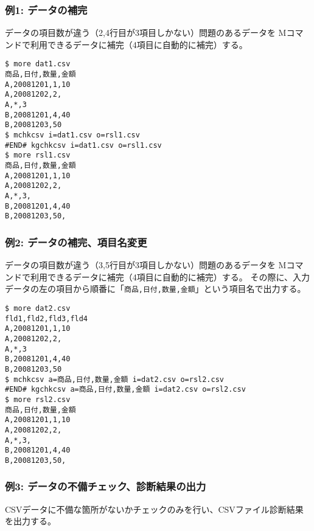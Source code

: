 \subsubsection*{例1: データの補完}

データの項目数が違う（2,4行目が3項目しかない）問題のあるデータを
Mコマンドで利用できるデータに補完（4項目に自動的に補完）する。


\begin{Verbatim}[baselinestretch=0.7,frame=single]
$ more dat1.csv
商品,日付,数量,金額
A,20081201,1,10
A,20081202,2,
A,*,3
B,20081201,4,40
B,20081203,50
$ mchkcsv i=dat1.csv o=rsl1.csv
#END# kgchkcsv i=dat1.csv o=rsl1.csv
$ more rsl1.csv
商品,日付,数量,金額
A,20081201,1,10
A,20081202,2,
A,*,3,
B,20081201,4,40
B,20081203,50,
\end{Verbatim}
\subsubsection*{例2: データの補完、項目名変更}

データの項目数が違う（3,5行目が3項目しかない）問題のあるデータを
Mコマンドで利用できるデータに補完（4項目に自動的に補完）する。
その際に、入力データの左の項目から順番に「\verb|商品,日付,数量,金額|」という項目名で出力する。


\begin{Verbatim}[baselinestretch=0.7,frame=single]
$ more dat2.csv
fld1,fld2,fld3,fld4
A,20081201,1,10
A,20081202,2,
A,*,3
B,20081201,4,40
B,20081203,50
$ mchkcsv a=商品,日付,数量,金額 i=dat2.csv o=rsl2.csv
#END# kgchkcsv a=商品,日付,数量,金額 i=dat2.csv o=rsl2.csv
$ more rsl2.csv
商品,日付,数量,金額
A,20081201,1,10
A,20081202,2,
A,*,3,
B,20081201,4,40
B,20081203,50,
\end{Verbatim}
\subsubsection*{例3: データの不備チェック、診断結果の出力}

CSVデータに不備な箇所がないかチェックのみを行い、CSVファイル診断結果を出力する。


